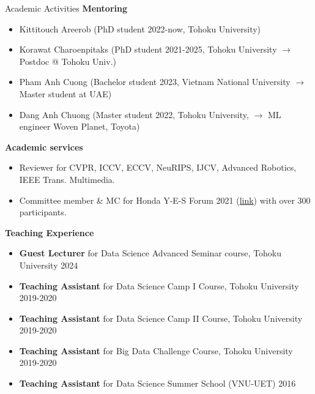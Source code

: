 \documentclass{resume} %
\begin{document}
\begin{rSection}{Academic Activities}
{\large \bf Mentoring}
\begin{itemize}
    \item {Kittitouch Areerob (PhD student 2022-now, Tohoku University)}
    \item {Korawat Charoenpitaks (PhD student 2021-2025, Tohoku University $\rightarrow$ Postdoc @ Tohoku Univ.)}
    \item {Pham Anh Cuong (Bachelor student 2023, Vietnam National University $\rightarrow$ Master student at UAE)}
    \item {Dang Anh Chuong (Master student 2022, Tohoku University, $\rightarrow$ ML engineer Woven Planet, Toyota)}
\end{itemize}
{\large \bf Academic services}
\begin{itemize}
    \item {{Reviewer} for CVPR, ICCV, ECCV, NeuRIPS, IJCV, Advanced Robotics, IEEE Trans. Multimedia.}
    \item {Committee member} \& {MC} for Honda Y-E-S Forum 2021 (\href{https://www.hondafoundation.jp/en/yes_forum2021.html}{link}) with over 300 participants.\\     
\end{itemize}

{\large \bf Teaching Experience}
\begin{itemize}
    \item {{\bf Guest Lecturer} for Data Science Advanced Seminar course, Tohoku University \hfill 2024} 
    \item {{\bf Teaching Assistant} for Data Science Camp I Course, Tohoku University \hfill 2019-2020} 
    \item {{\bf Teaching Assistant} for Data Science Camp II Course, Tohoku University \hfill 2019-2020} 
    \item {{\bf Teaching Assistant} for Big Data Challenge Course, Tohoku University \hfill 2019-2020} 
    \item {{\bf Teaching Assistant} for Data Science Summer School (VNU-UET) \hfill 2016} 
\end{itemize}


\end{rSection}
\end{document}
